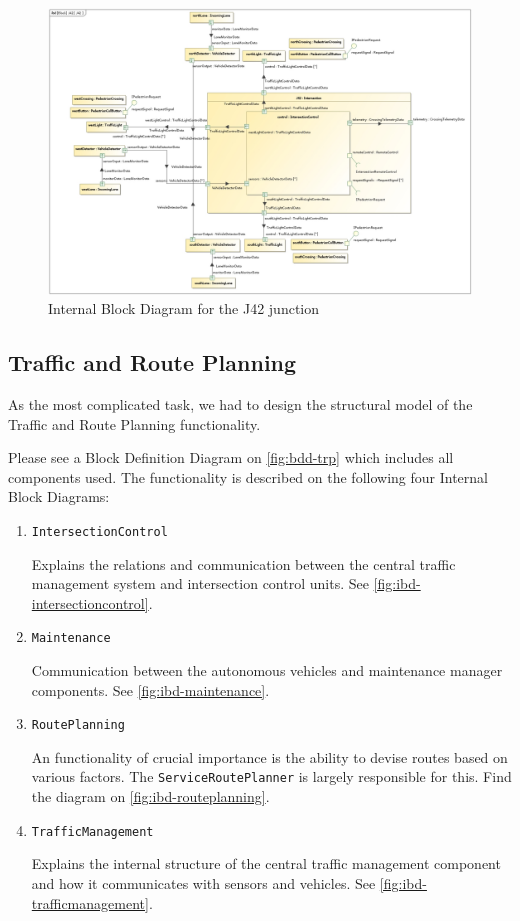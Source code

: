 \documentclass[a4paper]{article}
\begin{document}
\begin{figure}
	\centering
	\includegraphics[width=\textwidth]{ibd-j42.jpg}
	\caption{Internal Block Diagram for the J42 junction}
	\label{fig:ibd-j42}
\end{figure}


\subsection{Traffic and Route Planning}%
\label{subsec:trp}

As the most complicated task, we had to design the structural model of the
Traffic and Route Planning functionality.

Please see a Block Definition Diagram on \cref{fig:bdd-trp} which includes all
components used. The functionality is described on the following four Internal
Block Diagrams:

\begin{enumerate}
	\item \texttt{IntersectionControl}

		Explains the relations and communication between the central
		traffic management system and intersection control units. See
		\cref{fig:ibd-intersectioncontrol}.

	\item \texttt{Maintenance}

		Communication between the autonomous vehicles and maintenance
		manager components. See \cref{fig:ibd-maintenance}.

	\item \texttt{RoutePlanning}

		An functionality of crucial importance is the ability to devise
		routes based on various factors. The
		\texttt{ServiceRoutePlanner} is largely responsible for this.
		Find the diagram on \cref{fig:ibd-routeplanning}.

	\item \texttt{TrafficManagement}

		Explains the internal structure of the central traffic
		management component and how it communicates with sensors and
		vehicles. See \cref{fig:ibd-trafficmanagement}.
\end{enumerate}
\end{document}
